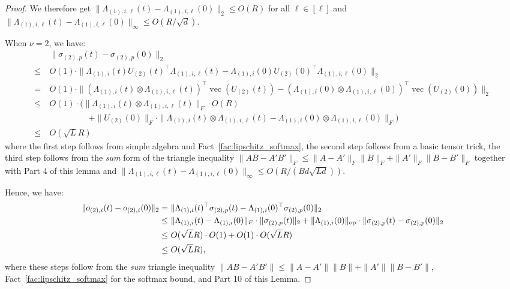 \documentclass[11pt]{article}
\theoremstyle{plain}
\DeclareMathOperator{\vect}{vec}
\begin{document}
\begin{proof}
    We therefore get $\| \Lambda_{(1), i, \ell}(t) -\Lambda_{(1), i, \ell}(0)  \|_2 \leq O(R)$ for all $\ell \in [\ell]$ and $\|\Lambda_{(1), i, \ell}(t) -\Lambda_{(1), i, \ell}(0)\|_\infty \leq O(R/\sqrt{d})$.

    When $\nu=2$, we have:
    \begin{align*}
        & ~ \|\sigma_{(2), p} (t) - \sigma_{(2), p} (0) \|_2 \\
        \leq & ~ O(1) \cdot \| \Lambda_{(1), i}(t) U_{(2)}(t)^\top  \Lambda_{(1), i, \ell}(t)  - \Lambda_{(1), i}(0) U_{(2)}(0)^\top  \Lambda_{(1), i, \ell}(0) \|_2 \\
        = & ~ O(1) \cdot \| (\Lambda_{(1), i}(t) \otimes \Lambda_{(1), i, \ell}(t))^\top \vect( U_{(2)}(t)) - (\Lambda_{(1), i}(0) \otimes \Lambda_{(1), i, \ell}(0))^\top \vect( U_{(2)}(0))\|_2 \\
        \leq & ~ O(1) \cdot \Big( \|\Lambda_{(1), i}(t) \otimes \Lambda_{(1), i, \ell}(t)\|_F \cdot O(R) \\
        & ~ \quad\quad ~~~~~~~~~~~~+\| U_{(2)}(0) \|_F \cdot \| \Lambda_{(1), i}(t) \otimes \Lambda_{(1), i, \ell}(t) - \Lambda_{(1), i}(0) \otimes \Lambda_{(1), i, \ell}(0)\|_F\Big) \\
        \leq & ~ O(\sqrt{L}R)
    \end{align*}
    where the first step follows from simple algebra and Fact~\ref{fac:lipschitz_softmax}, the second step follows from a basic tensor trick, the third step follows from the {\it sum} form of the triangle inequality $\|AB - A'B'\|_F \le \|A-A'\|_F \|B\|_F + \|A'\|_F \|B-B'\|_F$ together with Part 4 of this lemma and $\|\Lambda_{(1), i, \ell}(t) -\Lambda_{(1), i, \ell}(0)\|_\infty \leq O(R/(Bd\sqrt{Ld}))$.

    Hence, we have:
    \begin{align*}
        \| o_{(2), i}(t) - o_{(2), i}(0) \|_2 = & ~ \| \Lambda_{(1), i}(t)^\top \sigma_{(2), p}(t) - \Lambda_{(1), i}(0)^\top \sigma_{(2), p}(0) \|_2 \\
        \leq & ~ \| \Lambda_{(1), i}(t) - \Lambda_{(1), i}(0)\|_F \cdot \|\sigma_{(2),p}(t)\|_2 + \| \Lambda_{(1), i}(0)\|_{\rm op} \cdot \|\sigma_{(2),p}(t)-\sigma_{(2),p}(0)\|_2 \\
        \leq & ~ O(\sqrt L R)\cdot O(1) + O(1)\cdot O(\sqrt{L}R) \\
        \leq & ~ O(\sqrt{L}R),
    \end{align*}
    where these steps follow from the {\it sum} triangle inequality $\|AB-A'B'\|\le \|A-A'\|\|B\| + \|A'\|\|B-B'\|$, Fact~\ref{fac:lipschitz_softmax} for the softmax bound, and Part 10 of this Lemma.


\end{proof}
\end{document}
